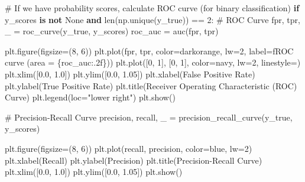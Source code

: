 \documentclass[
  letterpaper,
  DIV=11,
  numbers=noendperiod]{scrreprt}
\newenvironment{Shaded}{\begin{snugshade}}{\end{snugshade}}
\newcommand{\BuiltInTok}[1]{\textcolor[rgb]{0.00,0.23,0.31}{#1}}
\newcommand{\CommentTok}[1]{\textcolor[rgb]{0.37,0.37,0.37}{#1}}
\newcommand{\ControlFlowTok}[1]{\textcolor[rgb]{0.00,0.23,0.31}{\textbf{#1}}}
\newcommand{\DecValTok}[1]{\textcolor[rgb]{0.68,0.00,0.00}{#1}}
\newcommand{\FloatTok}[1]{\textcolor[rgb]{0.68,0.00,0.00}{#1}}
\newcommand{\KeywordTok}[1]{\textcolor[rgb]{0.00,0.23,0.31}{\textbf{#1}}}
\newcommand{\NormalTok}[1]{\textcolor[rgb]{0.00,0.23,0.31}{#1}}
\newcommand{\OperatorTok}[1]{\textcolor[rgb]{0.37,0.37,0.37}{#1}}
\newcommand{\SpecialCharTok}[1]{\textcolor[rgb]{0.37,0.37,0.37}{#1}}
\newcommand{\SpecialStringTok}[1]{\textcolor[rgb]{0.13,0.47,0.30}{#1}}
\newcommand{\StringTok}[1]{\textcolor[rgb]{0.13,0.47,0.30}{#1}}
\newcommand{\VariableTok}[1]{\textcolor[rgb]{0.07,0.07,0.07}{#1}}
\begin{document}
\begin{Shaded}
\begin{Highlighting}[]
    \CommentTok{\# If we have probability scores, calculate ROC curve (for binary classification)}
    \ControlFlowTok{if}\NormalTok{ y\_scores }\KeywordTok{is} \KeywordTok{not} \VariableTok{None} \KeywordTok{and} \BuiltInTok{len}\NormalTok{(np.unique(y\_true)) }\OperatorTok{==} \DecValTok{2}\NormalTok{:}
        \CommentTok{\# ROC Curve}
\NormalTok{        fpr, tpr, \_ }\OperatorTok{=}\NormalTok{ roc\_curve(y\_true, y\_scores)}
\NormalTok{        roc\_auc }\OperatorTok{=}\NormalTok{ auc(fpr, tpr)}
        
\NormalTok{        plt.figure(figsize}\OperatorTok{=}\NormalTok{(}\DecValTok{8}\NormalTok{, }\DecValTok{6}\NormalTok{))}
\NormalTok{        plt.plot(fpr, tpr, color}\OperatorTok{=}\StringTok{\textquotesingle{}darkorange\textquotesingle{}}\NormalTok{, lw}\OperatorTok{=}\DecValTok{2}\NormalTok{, }
\NormalTok{                 label}\OperatorTok{=}\SpecialStringTok{f\textquotesingle{}ROC curve (area = }\SpecialCharTok{\{}\NormalTok{roc\_auc}\SpecialCharTok{:.2f\}}\SpecialStringTok{)\textquotesingle{}}\NormalTok{)}
\NormalTok{        plt.plot([}\DecValTok{0}\NormalTok{, }\DecValTok{1}\NormalTok{], [}\DecValTok{0}\NormalTok{, }\DecValTok{1}\NormalTok{], color}\OperatorTok{=}\StringTok{\textquotesingle{}navy\textquotesingle{}}\NormalTok{, lw}\OperatorTok{=}\DecValTok{2}\NormalTok{, linestyle}\OperatorTok{=}\StringTok{\textquotesingle{}{-}{-}\textquotesingle{}}\NormalTok{)}
\NormalTok{        plt.xlim([}\FloatTok{0.0}\NormalTok{, }\FloatTok{1.0}\NormalTok{])}
\NormalTok{        plt.ylim([}\FloatTok{0.0}\NormalTok{, }\FloatTok{1.05}\NormalTok{])}
\NormalTok{        plt.xlabel(}\StringTok{\textquotesingle{}False Positive Rate\textquotesingle{}}\NormalTok{)}
\NormalTok{        plt.ylabel(}\StringTok{\textquotesingle{}True Positive Rate\textquotesingle{}}\NormalTok{)}
\NormalTok{        plt.title(}\StringTok{\textquotesingle{}Receiver Operating Characteristic (ROC) Curve\textquotesingle{}}\NormalTok{)}
\NormalTok{        plt.legend(loc}\OperatorTok{=}\StringTok{"lower right"}\NormalTok{)}
\NormalTok{        plt.show()}
        
        \CommentTok{\# Precision{-}Recall Curve}
\NormalTok{        precision, recall, \_ }\OperatorTok{=}\NormalTok{ precision\_recall\_curve(y\_true, y\_scores)}
        
\NormalTok{        plt.figure(figsize}\OperatorTok{=}\NormalTok{(}\DecValTok{8}\NormalTok{, }\DecValTok{6}\NormalTok{))}
\NormalTok{        plt.plot(recall, precision, color}\OperatorTok{=}\StringTok{\textquotesingle{}blue\textquotesingle{}}\NormalTok{, lw}\OperatorTok{=}\DecValTok{2}\NormalTok{)}
\NormalTok{        plt.xlabel(}\StringTok{\textquotesingle{}Recall\textquotesingle{}}\NormalTok{)}
\NormalTok{        plt.ylabel(}\StringTok{\textquotesingle{}Precision\textquotesingle{}}\NormalTok{)}
\NormalTok{        plt.title(}\StringTok{\textquotesingle{}Precision{-}Recall Curve\textquotesingle{}}\NormalTok{)}
\NormalTok{        plt.xlim([}\FloatTok{0.0}\NormalTok{, }\FloatTok{1.0}\NormalTok{])}
\NormalTok{        plt.ylim([}\FloatTok{0.0}\NormalTok{, }\FloatTok{1.05}\NormalTok{])}
\NormalTok{        plt.show()}


\end{Highlighting}
\end{Shaded}
\end{document}
